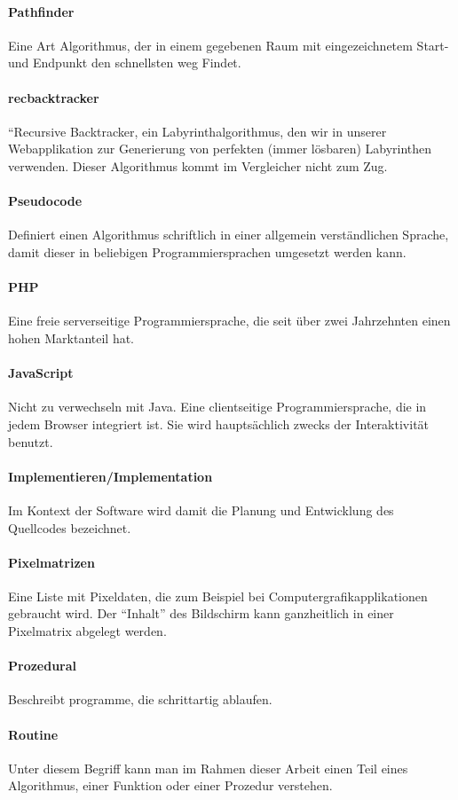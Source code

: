 \paragraph{Pathfinder} Eine Art Algorithmus, der in einem gegebenen Raum mit eingezeichnetem Start- und Endpunkt den schnellsten weg Findet.
\paragraph{recbacktracker} ``Recursive Backtracker, ein Labyrinthalgorithmus, den wir in unserer Webapplikation zur Generierung von perfekten (immer lösbaren) Labyrinthen verwenden. Dieser Algorithmus kommt im Vergleicher nicht zum Zug.
\paragraph{Pseudocode} Definiert einen Algorithmus schriftlich in einer allgemein verständlichen Sprache, damit dieser in beliebigen Programmiersprachen umgesetzt werden kann.
\paragraph{PHP} Eine freie serverseitige Programmiersprache, die seit über zwei Jahrzehnten einen hohen Marktanteil hat.
\paragraph{JavaScript} Nicht zu verwechseln mit Java. Eine clientseitige Programmiersprache, die in jedem Browser integriert ist. Sie wird hauptsächlich zwecks der Interaktivität benutzt. 
\paragraph{Implementieren/Implementation} Im Kontext der Software wird damit die Planung und Entwicklung des Quellcodes bezeichnet.
\paragraph{Pixelmatrizen} Eine Liste mit Pixeldaten, die zum Beispiel bei Computergrafikapplikationen gebraucht wird. Der ``Inhalt'' des Bildschirm kann ganzheitlich in einer Pixelmatrix abgelegt werden.
\paragraph{Prozedural} Beschreibt programme, die schrittartig ablaufen.
\paragraph{Routine} Unter diesem Begriff kann man im Rahmen dieser Arbeit einen Teil eines Algorithmus, einer Funktion oder einer Prozedur verstehen.
